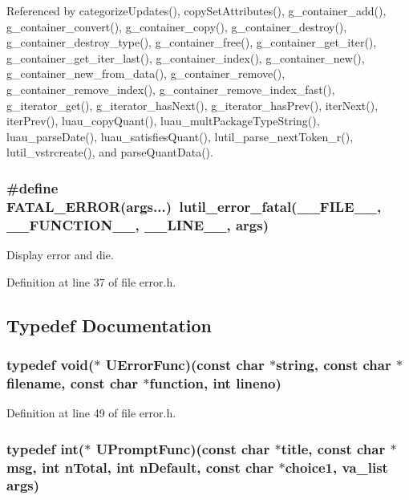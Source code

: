 Referenced by categorize\-Updates(), copy\-Set\-Attributes(), g\_\-container\_\-add(), g\_\-container\_\-convert(), g\_\-container\_\-copy(), g\_\-container\_\-destroy(), g\_\-container\_\-destroy\_\-type(), g\_\-container\_\-free(), g\_\-container\_\-get\_\-iter(), g\_\-container\_\-get\_\-iter\_\-last(), g\_\-container\_\-index(), g\_\-container\_\-new(), g\_\-container\_\-new\_\-from\_\-data(), g\_\-container\_\-remove(), g\_\-container\_\-remove\_\-index(), g\_\-container\_\-remove\_\-index\_\-fast(), g\_\-iterator\_\-get(), g\_\-iterator\_\-has\-Next(), g\_\-iterator\_\-has\-Prev(), iter\-Next(), iter\-Prev(), luau\_\-copy\-Quant(), luau\_\-mult\-Package\-Type\-String(), luau\_\-parse\-Date(), luau\_\-satisfies\-Quant(), lutil\_\-parse\_\-next\-Token\_\-r(), lutil\_\-vstrcreate(), and parse\-Quant\-Data().
\subsubsection{\setlength{\rightskip}{0pt plus 5cm}\#define FATAL\_\-ERROR(args...)\ lutil\_\-error\_\-fatal(\_\-\_\-FILE\_\-\_\-, \_\-\_\-FUNCTION\_\-\_\-, \_\-\_\-LINE\_\-\_\-, args)}\label{error_8h_a0}


Display error and die. 



Definition at line 37 of file error.h.

\subsection{Typedef Documentation}
\subsubsection{\setlength{\rightskip}{0pt plus 5cm}typedef void($\ast$ {\bf UError\-Func})(const char $\ast$string, const char $\ast$filename, const char $\ast$function, int lineno)}\label{error_8h_a3}




Definition at line 49 of file error.h.
\subsubsection{\setlength{\rightskip}{0pt plus 5cm}typedef int($\ast$ {\bf UPrompt\-Func})(const char $\ast$title, const char $\ast$msg, int n\-Total, int n\-Default, const char $\ast$choice1, va\_\-list args)}\label{error_8h_a4}




